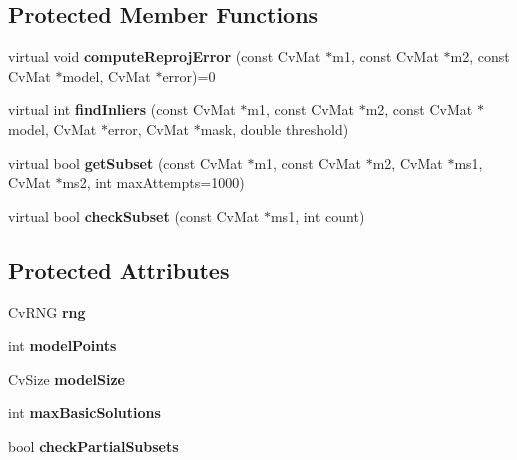 \subsection*{Protected Member Functions}
\begin{DoxyCompactItemize}
\item 
\hypertarget{classSSMEstimator_a28febe2c602a2fc504e45c38f3f85e55}{virtual void {\bfseries compute\-Reproj\-Error} (const Cv\-Mat $\ast$m1, const Cv\-Mat $\ast$m2, const Cv\-Mat $\ast$model, Cv\-Mat $\ast$error)=0}\label{classSSMEstimator_a28febe2c602a2fc504e45c38f3f85e55}

\item 
\hypertarget{classSSMEstimator_a076f11da6520c43e863694cd79d73b12}{virtual int {\bfseries find\-Inliers} (const Cv\-Mat $\ast$m1, const Cv\-Mat $\ast$m2, const Cv\-Mat $\ast$model, Cv\-Mat $\ast$error, Cv\-Mat $\ast$mask, double threshold)}\label{classSSMEstimator_a076f11da6520c43e863694cd79d73b12}

\item 
\hypertarget{classSSMEstimator_a49c893d5c9bdc4ea54f1cfef0b220ab7}{virtual bool {\bfseries get\-Subset} (const Cv\-Mat $\ast$m1, const Cv\-Mat $\ast$m2, Cv\-Mat $\ast$ms1, Cv\-Mat $\ast$ms2, int max\-Attempts=1000)}\label{classSSMEstimator_a49c893d5c9bdc4ea54f1cfef0b220ab7}

\item 
\hypertarget{classSSMEstimator_a8b8b2a6bed88f34fced9375dff5449bc}{virtual bool {\bfseries check\-Subset} (const Cv\-Mat $\ast$ms1, int count)}\label{classSSMEstimator_a8b8b2a6bed88f34fced9375dff5449bc}

\end{DoxyCompactItemize}
\subsection*{Protected Attributes}
\begin{DoxyCompactItemize}
\item 
\hypertarget{classSSMEstimator_aa75e346ea44c8a72b922500d6f7fea70}{Cv\-R\-N\-G {\bfseries rng}}\label{classSSMEstimator_aa75e346ea44c8a72b922500d6f7fea70}

\item 
\hypertarget{classSSMEstimator_a1e82c19646d5a993e6123d5479c948a0}{int {\bfseries model\-Points}}\label{classSSMEstimator_a1e82c19646d5a993e6123d5479c948a0}

\item 
\hypertarget{classSSMEstimator_adf7950e9a8b349001247200ebbdede86}{Cv\-Size {\bfseries model\-Size}}\label{classSSMEstimator_adf7950e9a8b349001247200ebbdede86}

\item 
\hypertarget{classSSMEstimator_a7172e48b2f84e9b2132483ae8b0c5dce}{int {\bfseries max\-Basic\-Solutions}}\label{classSSMEstimator_a7172e48b2f84e9b2132483ae8b0c5dce}

\item 
\hypertarget{classSSMEstimator_abf0aec9c2f3d6ea8400bb8592ab28ffd}{bool {\bfseries check\-Partial\-Subsets}}\label{classSSMEstimator_abf0aec9c2f3d6ea8400bb8592ab28ffd}

\end{DoxyCompactItemize}


